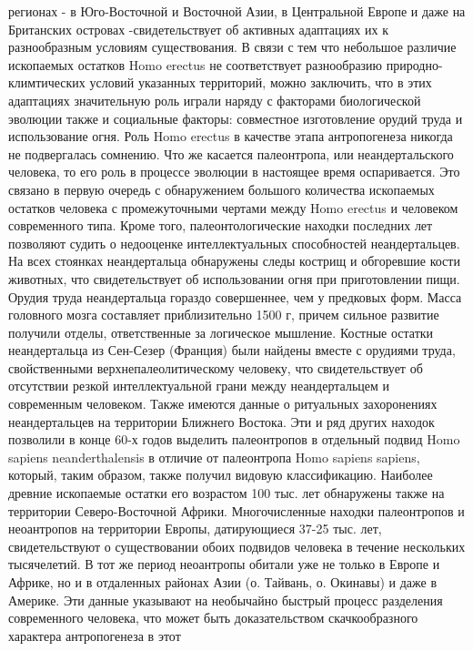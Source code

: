 \documentclass[12pt]{article}
\begin{document}
регионах - в Юго-Восточной и Восточной Азии, в Центральной Европе и даже на Британских островах -свидетельствует об активных адаптациях их к разнообразным условиям существования. В связи с тем что
небольшое  различие  ископаемых  остатков  Homo  erectus  не  соответствует  разнообразию  природно-климтических условий указанных территорий, можно заключить, что в этих адаптациях значительную роль
играли наряду с факторами биологической эволюции также и социальные факторы: совместное изготовление
орудий труда и использование огня.
Роль  Homo  erectus  в  качестве  этапа  антропогенеза  никогда  не  подвергалась  сомнению.  Что  же  касается
палеонтропа, или неандертальского человека, то его роль в процессе эволюции в настоящее время оспаривается.
Это  связано  в  первую  очередь  с  обнаружением  большого  количества  ископаемых  остатков  человека  с
промежуточными  чертами  между  Homo  erectus  и  человеком  современного  типа.  Кроме  того,
палеонтологические находки последних лет позволяют судить о недооценке интеллектуальных способностей
неандертальцев. На всех стоянках неандертальца обнаружены следы кострищ и обгоревшие кости животных,
что свидетельствует об использовании огня при приготовлении пищи. Орудия труда неандертальца гораздо
совершеннее, чем у предковых форм. Масса головного мозга составляет приблизительно 1500 г, причем сильное
развитие получили отделы, ответственные за логическое мышление. Костные остатки неандертальца из Сен-Сезер (Франция) были найдены вместе с орудиями труда, свойственными верхнепалеолитическому человеку,
что  свидетельствует  об  отсутствии  резкой  интеллектуальной  грани  между  неандертальцем  и  современным
человеком.  Также  имеются  данные  о  ритуальных  захоронениях  неандертальцев  на  территории  Ближнего
Востока.
Эти и ряд других находок позволили в конце 60-х годов выделить палеонтропов в отдельный подвид Homo
sapiens neanderthalensis в отличие от палеонтропа Homo sapiens sapiens, который, таким образом, также получил
видовую классификацию. Наиболее древние ископаемые остатки его возрастом 100 тыс. лет обнаружены также
на  территории  Северо-Восточной  Африки.  Многочисленные  находки  палеонтропов  и  неоантропов  на
территории Европы, датирующиеся 37-25 тыс. лет, свидетельствуют о существовании обоих подвидов человека
в течение нескольких тысячелетий.
В тот же период неоантропы обитали уже не только в Европе и Африке, но и в отдаленных районах Азии (о.
Тайвань, о. Окинавы) и даже в Америке. Эти данные указывают на необычайно быстрый процесс разделения
современного  человека,  что  может  быть  доказательством  скачкообразного  характера  антропогенеза  в  этот
\end{document}

